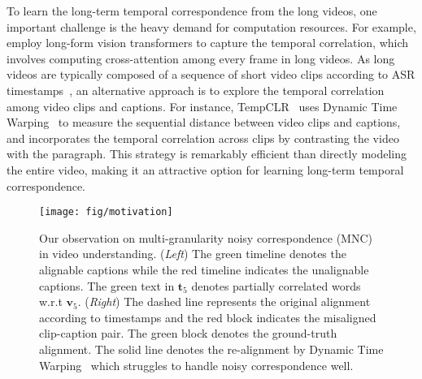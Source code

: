 To learn the long-term temporal correspondence from the long videos, one important challenge is the heavy demand for computation resources. For example, \cite{tan,bertasius2021space} employ long-form vision transformers to capture the temporal correlation, which involves computing cross-attention among every frame in long videos. As long videos are typically composed of a sequence of short video clips according to ASR timestamps~\citep{milnce}, an alternative approach is to explore the temporal correlation among video clips and captions. For instance, TempCLR~\citep{tempclr} uses Dynamic Time Warping~\citep{muller2007dynamic,softdtw,zhou2009canonical} to measure the sequential distance between video clips and captions, and incorporates the temporal correlation across clips by contrasting the video with the paragraph. This strategy is remarkably efficient than directly modeling the entire video, making it an attractive option for learning long-term temporal correspondence.  

\begin{figure}
\centering
\texttt{[image: fig/motivation]}
\caption{Our observation on multi-granularity noisy correspondence (MNC) in video understanding. 
(\textit{Left}) The green timeline denotes the alignable captions while the red timeline indicates the unalignable captions. The green text in $\mathbf{t}_5$ denotes partially correlated words w.r.t $\mathbf{v}_5$.
 (\textit{Right}) The dashed line represents the original alignment according to timestamps and the red block indicates the misaligned clip-caption pair. The green block denotes the ground-truth alignment. The solid line denotes the re-alignment by Dynamic Time Warping~\citep{muller2007dynamic} which struggles to handle noisy correspondence well. 
}
\label{fig:BasicIdea}
\end{figure}

